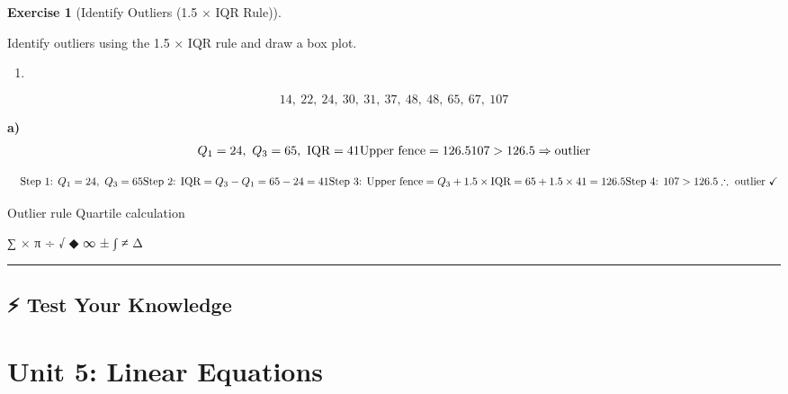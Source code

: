 \documentclass[
  letterpaper,
  DIV=11,
  numbers=noendperiod]{scrreprt}
\providecommand{\tightlist}{%
  \setlength{\itemsep}{0pt}\setlength{\parskip}{0pt}}
\theoremstyle{definition}
\newtheorem{exercise}{Exercise}[chapter]
\theoremstyle{remark}
\begin{document}
\begin{exercise}[Identify Outliers (1.5 × IQR
Rule)]\protect\hypertarget{exr-bp-3}{}\label{exr-bp-3}

Identify outliers using the 1.5 × IQR rule and draw a box plot.

\begin{enumerate}
\def\labelenumi{\alph{enumi})}
\tightlist
\item
\end{enumerate}

\[14,\ 22,\ 24,\ 30,\ 31,\ 37,\ 48,\ 48,\ 65,\ 67,\ 107\]

\begin{tcolorbox}[enhanced jigsaw, opacitybacktitle=0.6, coltitle=black, arc=.35mm, colframe=quarto-callout-tip-color-frame, colback=white, bottomrule=.15mm, left=2mm, colbacktitle=quarto-callout-tip-color!10!white, titlerule=0mm, opacityback=0, title=\textcolor{quarto-callout-tip-color}{\faLightbulb}\hspace{0.5em}{🔍 View Solution}, leftrule=.75mm, breakable, rightrule=.15mm, bottomtitle=1mm, toptitle=1mm, toprule=.15mm]

\textbf{a)}
\[Q_1=24,\ Q_3=65,\ \text{IQR}=41\\\text{Upper fence}=126.5\\107>126.5\Rightarrow\text{outlier}\]

\[\quad \text{Step 1: }Q_1=24,\ Q_3=65\\[4pt]\text{Step 2: IQR}=Q_3-Q_1=65-24=41\\[4pt]\text{Step 3: Upper fence}=Q_3+1.5\times\text{IQR}=65+1.5\times41=126.5\\[4pt]\text{Step 4: }107>126.5\therefore\text{ outlier }\checkmark\]

\end{tcolorbox}

{Outlier rule} {Quartile calculation}

\end{exercise}

∑ × π ÷ √ ◆ ∞ ± ∫ ≠ Δ

\begin{center}\rule{0.5\linewidth}{0.5pt}\end{center}

\section{⚡ Test Your Knowledge}\label{sec-worksheet}

\chapter{Unit 5: Linear Equations}\label{unit-5-linear-equations}
\end{document}
